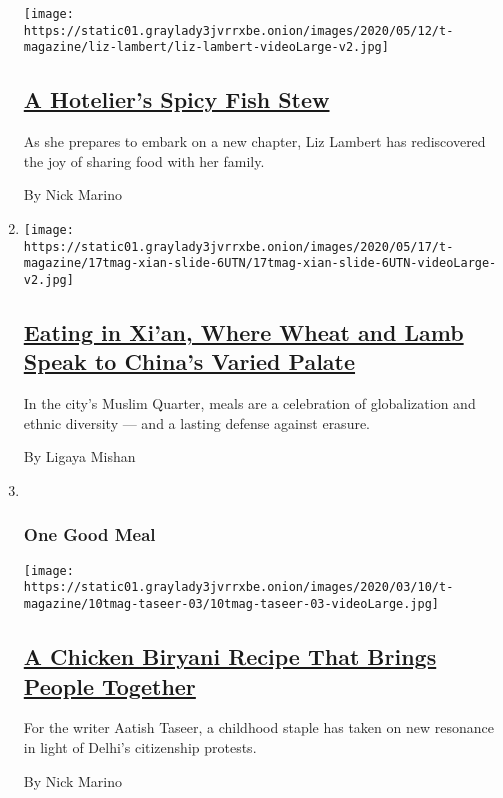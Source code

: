 \begin{enumerate}
  \texttt{[image: https://static01.graylady3jvrrxbe.onion/images/2020/05/12/t-magazine/liz-lambert/liz-lambert-videoLarge-v2.jpg]}

  \hypertarget{a-hoteliers-spicy-fish-stew}{%
  \subsection{\texorpdfstring{\href{/2020/05/18/t-magazine/liz-lambert-bouillabaisse-recipe.html}{A
  Hotelier's Spicy Fish
  Stew}}{A Hotelier's Spicy Fish Stew}}\label{a-hoteliers-spicy-fish-stew}}

  As she prepares to embark on a new chapter, Liz Lambert has
  rediscovered the joy of sharing food with her family.

  By Nick Marino
\item
  \texttt{[image: https://static01.graylady3jvrrxbe.onion/images/2020/05/17/t-magazine/17tmag-xian-slide-6UTN/17tmag-xian-slide-6UTN-videoLarge-v2.jpg]}

  \hypertarget{eating-in-xian-where-wheat-and-lamb-speak-to-chinas-varied-palate}{%
  \subsection{\texorpdfstring{\href{/2020/05/11/t-magazine/xian-china-food.html}{Eating
  in Xi'an, Where Wheat and Lamb Speak to China's Varied
  Palate}}{Eating in Xi'an, Where Wheat and Lamb Speak to China's Varied Palate}}\label{eating-in-xian-where-wheat-and-lamb-speak-to-chinas-varied-palate}}

  In the city's Muslim Quarter, meals are a celebration of globalization
  and ethnic diversity --- and a lasting defense against erasure.

  By Ligaya Mishan
\item ~
  \hypertarget{one-good-meal-3}{%
  \subsubsection{One Good Meal}\label{one-good-meal-3}}

  \texttt{[image: https://static01.graylady3jvrrxbe.onion/images/2020/03/10/t-magazine/10tmag-taseer-03/10tmag-taseer-03-videoLarge.jpg]}

  \hypertarget{a-chicken-biryani-recipe-that-brings-people-together}{%
  \subsection{\texorpdfstring{\href{/2020/03/10/t-magazine/aatish-taseer-chicken-biryani.html}{A
  Chicken Biryani Recipe That Brings People
  Together}}{A Chicken Biryani Recipe That Brings People Together}}\label{a-chicken-biryani-recipe-that-brings-people-together}}

  For the writer Aatish Taseer, a childhood staple has taken on new
  resonance in light of Delhi's citizenship protests.

  By Nick Marino
\end{enumerate}

